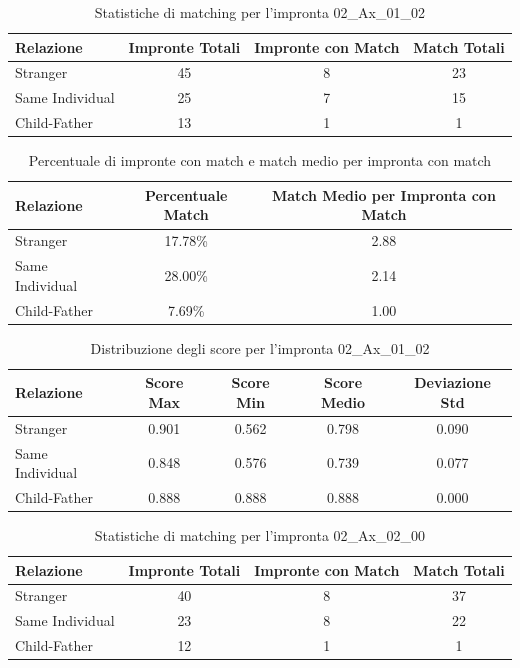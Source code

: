 \begin{table}[htbp]
\centering
\caption{Statistiche di matching per l'impronta 02\_Ax\_01\_02}
\label{tab:results_02_Ax_01_02}
\begin{tabular}{|l|c|c|c|}
\hline
\textbf{Relazione} & \textbf{Impronte Totali} & \textbf{Impronte con Match} & \textbf{Match Totali} \\
\hline
Stranger & 45 & 8 & 23 \\
\hline
Same Individual & 25 & 7 & 15 \\
\hline
Child-Father & 13 & 1 & 1 \\
\hline
\end{tabular}
\end{table}


\begin{table}[htbp]
\centering
\caption{Percentuale di impronte con match e match medio per impronta con match}
\label{tab:match_percentage_02_Ax_01_02}
\begin{tabular}{|l|c|c|}
\hline
\textbf{Relazione} & \textbf{Percentuale Match} & \textbf{Match Medio per Impronta con Match} \\
\hline
Stranger & 17.78\% & 2.88 \\
\hline
Same Individual & 28.00\% & 2.14 \\
\hline
Child-Father & 7.69\% & 1.00 \\
\hline
\end{tabular}
\end{table}


\begin{table}[htbp]
\centering
\caption{Distribuzione degli score per l'impronta 02\_Ax\_01\_02}
\label{tab:scores_02_Ax_01_02}
\begin{tabular}{|l|c|c|c|c|}
\hline
\textbf{Relazione} & \textbf{Score Max} & \textbf{Score Min} & \textbf{Score Medio} & \textbf{Deviazione Std} \\
\hline
Stranger & 0.901 & 0.562 & 0.798 & 0.090 \\
\hline
Same Individual & 0.848 & 0.576 & 0.739 & 0.077 \\
\hline
Child-Father & 0.888 & 0.888 & 0.888 & 0.000 \\
\hline
\end{tabular}
\end{table}


\begin{table}[htbp]
\centering
\caption{Statistiche di matching per l'impronta 02\_Ax\_02\_00}
\label{tab:results_02_Ax_02_00}
\begin{tabular}{|l|c|c|c|}
\hline
\textbf{Relazione} & \textbf{Impronte Totali} & \textbf{Impronte con Match} & \textbf{Match Totali} \\
\hline
Stranger & 40 & 8 & 37 \\
\hline
Same Individual & 23 & 8 & 22 \\
\hline
Child-Father & 12 & 1 & 1 \\
\hline
\end{tabular}
\end{table}



